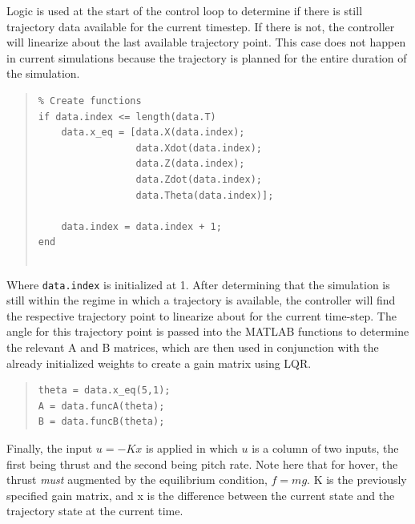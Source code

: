 \documentclass[12pt]{article}
\begin{document}
Logic is used at the start of the control loop to determine if there is still trajectory data available for the current timestep.  If there is not, the controller will linearize about the last available trajectory point.  This case does not happen in current simulations because the trajectory is planned for the entire duration of the simulation.
\begin{quote}
\begin{lstlisting}
% Create functions
if data.index <= length(data.T)
    data.x_eq = [data.X(data.index);
                 data.Xdot(data.index);
                 data.Z(data.index);
                 data.Zdot(data.index);
                 data.Theta(data.index)];
             
    data.index = data.index + 1;
end


\end{lstlisting}
\end{quote}
Where \lstinline!data.index! is initialized at 1. 
\newline
\newline
After determining that the simulation is still within the regime in which a trajectory is available, the controller will find the respective trajectory point to linearize about for the current time-step.  The angle for this trajectory point is passed into the MATLAB functions to determine the relevant A and B matrices, which are then used in conjunction with the already initialized weights to create a gain matrix using LQR.
\begin{quote}
\begin{lstlisting}
theta = data.x_eq(5,1);
A = data.funcA(theta);
B = data.funcB(theta);

\end{lstlisting}
\end{quote}

Finally, the input $u = -Kx$ is applied in which $u$ is a column of two inputs, the first being thrust and the second being pitch rate.  Note here that for hover, the thrust \textit{must} augmented by the equilibrium condition, $f = mg$.  K is the previously specified gain matrix, and x is the difference between the current state and the trajectory state at the current time.

\end{document}
